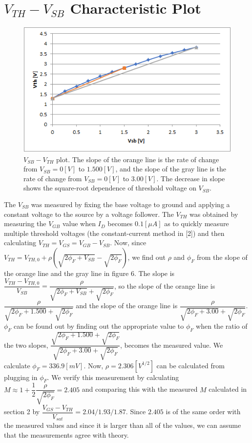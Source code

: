 \documentclass[a4paper, itemph]{oblivoir}
\theoremstyle{definition}
\begin{document}
\section{$V_{TH}-V_{SB}$ Characteristic Plot}
\begin{figure}[htb]
    \centering
    \includegraphics[width=0.5\linewidth]{Vsb-Vth.png}
    \caption{$V_{SB}-V_{TH}$ plot. The slope of the orange line is the rate of change from $V_{SB}=0[V]$ to $1.500[V]$, and the slope of the gray line is the rate of change from $V_{SB}=0[V]$ to $3.00[V]$. The decrease in slope shows the square-root dependence of threshold voltage on $V_{SB}$.}
\end{figure}

The $V_{SB}$ was measured by fixing the base voltage to ground and applying a constant voltage to the source by a voltage follower. The $V_{TH}$ was obtained by measuring the $V_{GB}$ value when $I_{D}$ becomes $0.1[\mu A]$ as to quickly measure multiple threshold voltages (the constant-current method in [2]) and then calculating $V_{TH}=V_{GS}=V_{GB}-V_{SB}$. Now, since $V_{TH}=V_{TH,0}+\rho(\sqrt{2\phi_F + V_{SB}}-\sqrt{2\phi_F})$, we find out $\rho$ and $\phi_F$ from the slope of the orange line and the gray line in figure 6. The slope is $\dfrac{V_{TH}-V_{TH,0}}{V_{SB}}=\dfrac{\rho}{\sqrt{2\phi_F + V_{SB}}+\sqrt{2\phi_F}}$, so the slope of the orange line is $\dfrac{\rho}{\sqrt{2\phi_F + 1.500}+\sqrt{2\phi_F}}$ and the slope of the orange line is $\dfrac{\rho}{\sqrt{2\phi_F + 3.00}+\sqrt{2\phi_F}}$. $\phi_F$ can be found out by finding out the appropriate value to $\phi_F$ when the ratio of the two slopes, $\dfrac{\sqrt{2\phi_F + 1.500}+\sqrt{2\phi_F}}{\sqrt{2\phi_F + 3.00}+\sqrt{2\phi_F}}$, becomes the measured value. We calculate $\phi_F=336.9[mV]$. Now, $\rho=2.306[V^{1/2}]$ can be calculated from plugging in $\phi_F$. We verify this measurement by calculating $M\approx 1+\dfrac{1}{2}\dfrac{\rho}{\sqrt{2\phi_F}}=2.405$ and comparing this with the measured $M$ calculated in section 2 by $\dfrac{V_{GS}-V_{TH}}{V_{sat}}=2.04/1.93/1.87$. Since $2.405$ is of the same order with the measured values and since it is larger than all of the values, we can assume that the measurements agree with theory.
\end{document}
